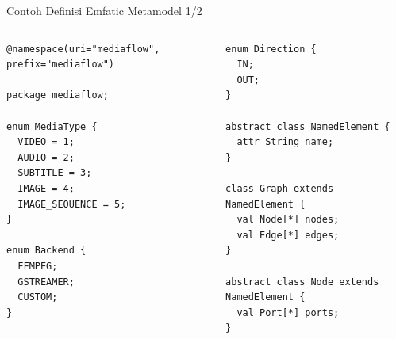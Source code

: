 \documentclass[aspectratio=169, table]{beamer}
\begin{document}
\begin{frame}[fragile]{Contoh Definisi Emfatic Metamodel 1/2}
\vspace{20pt}
\begin{columns}[T]


\begin{lstlisting}[language=emfatic, basicstyle=\ttfamily\scriptsize]
@namespace(uri="mediaflow", prefix="mediaflow")

package mediaflow;

enum MediaType {
  VIDEO = 1;
  AUDIO = 2;
  SUBTITLE = 3;
  IMAGE = 4;
  IMAGE_SEQUENCE = 5;
}

enum Backend {
  FFMPEG;
  GSTREAMER;
  CUSTOM;
}

\end{lstlisting}


\begin{lstlisting}[language=emfatic, basicstyle=\ttfamily\scriptsize, firstnumber=18]
enum Direction {
  IN;
  OUT;
}

abstract class NamedElement {
  attr String name;
}

class Graph extends NamedElement {
  val Node[*] nodes;
  val Edge[*] edges;
}

abstract class Node extends NamedElement {
  val Port[*] ports;
}
\end{lstlisting}

\end{columns}

\end{frame}
\end{document}
